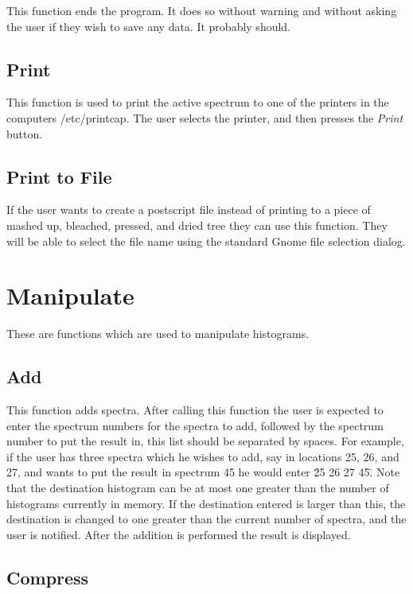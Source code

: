 This function ends the program.  It does so without warning and without asking the user if they wish to save any data.  It probably should.

\subsection{Print}

This function is used to print the active spectrum to one of the printers in the computers /etc/printcap.  The user selects the printer, and then presses the {\it Print} button.

\subsection{Print to File}

If the user wants to create a postscript file instead of printing to a piece of mashed up, bleached, pressed, and dried tree they can use this function.  They will be able to select the file name using the standard Gnome file selection dialog.

\section{Manipulate}

These are functions which are used to manipulate histograms.

\subsection{Add}

This function adds spectra.  After calling this function the user is expected to enter the spectrum numbers for the spectra to add, followed by the spectrum number to put the result in, this list should be separated by spaces.  For example, if the user has three spectra which he wishes to add, say in locations 25, 26, and 27, and wants to put the result in spectrum 45 he would enter \"25 26 27 45\".  Note that the destination histogram can be at most one greater than the number of histograms currently in memory.  If the destination entered is larger than this, the destination is changed to one greater than the current number of spectra, and the user is notified.  After the addition is performed the result is displayed.

\subsection{Compress}

